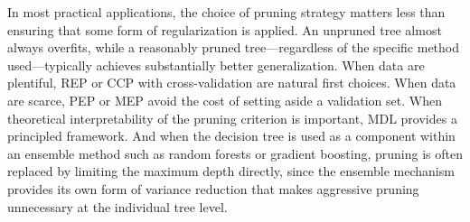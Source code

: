 In most practical applications, the choice of pruning strategy matters less than ensuring
that some form of regularization is applied. An unpruned tree almost always overfits, while
a reasonably pruned tree---regardless of the specific method used---typically achieves
substantially better generalization. When data are plentiful, REP or CCP with
cross-validation are natural first choices. When data are scarce, PEP or MEP avoid the cost
of setting aside a validation set. When theoretical interpretability of the pruning criterion
is important, MDL provides a principled framework. And when the decision tree is used as a
component within an ensemble method such as random forests or gradient boosting, pruning is
often replaced by limiting the maximum depth directly, since the ensemble mechanism provides
its own form of variance reduction that makes aggressive pruning unnecessary at the
individual tree level.


%